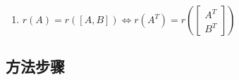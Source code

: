 \documentclass[./linear_algebra.tex]{subfiles}
\begin{document}
\begin{enumerate}
\[\begin{bmatrix}
                &        &        &        & \ddots & \vdots & \vdots  \\
                &        &        &        &        & 0      & 0       \\
            \end{bmatrix}.
        \]
        \begin{enumerate}
            \item 如果$d_{r+1} \neq 0$，方程组\textbf{无解}
            \item 如果$d_{r+1} = 0$，方程组\textbf{有解}，并且
            \begin{enumerate}
                \item 当$r = n$时有唯一解
                \item 当$r < n$时有无穷多解
            \end{enumerate}
        \end{enumerate}
        \item $r(A) = r([A, B]) \Leftrightarrow r(A^T) = r\!\left(\begin{bmatrix}
                                                                      A^T\\
                                                                      B^T
        \end{bmatrix}\right)$
    \end{enumerate}

    \subsection{方法步骤}
\end{document}
